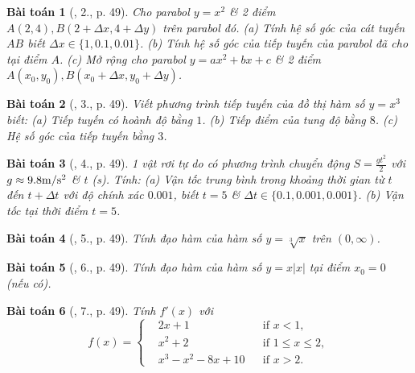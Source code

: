\documentclass{article}
\newtheorem{baitoan}{Bài toán}
\begin{document}
\begin{baitoan}[\cite{TLCT_BT_dai_so_giai_tich_11}, 2., p. 49]
	Cho parabol $y = x^2$ \& 2 điểm $A(2,4),B(2 + \Delta x,4 + \Delta y)$ trên parabol đó. (a) Tính hệ số góc của cát tuyến $AB$ biết $\Delta x\in\{1,0.1,0.01\}$. (b) Tính hệ số góc của tiếp tuyến của parabol đã cho tại điểm $A$. (c) Mở rộng cho parabol $y = ax^2 + bx + c$ \& 2 điểm $A(x_0,y_0),B(x_0 + \Delta x,y_0 + \Delta y)$.
\end{baitoan}

\begin{baitoan}[\cite{TLCT_BT_dai_so_giai_tich_11}, 3., p. 49]
	Viết phương trình tiếp tuyến của đồ thị hàm số $y = x^3$ biết: (a) Tiếp tuyến có hoành độ bằng $1$. (b) Tiếp điểm của tung độ bằng $8$. (c) Hệ số góc của tiếp tuyến bằng $3$.
\end{baitoan}

\begin{baitoan}[\cite{TLCT_BT_dai_so_giai_tich_11}, 4., p. 49]
	1 vật rơi tự do có phương trình chuyển động $S = \frac{gt^2}{2}$ với $g\approx9.8{\rm m{\tt/}s^2}$ \& $t$ (s). Tính: (a) Vận tốc trung bình trong khoảng thời gian từ $t$ đến $t + \Delta t$ với độ chính xác $0.001$, biết $t = 5$ \& $\Delta t\in\{0.1,0.001,0.001\}$. (b) Vận tốc tại thời điểm $t = 5$.
\end{baitoan}

\begin{baitoan}[\cite{TLCT_BT_dai_so_giai_tich_11}, 5., p. 49]
	Tính đạo hàm của hàm số $y = \sqrt[3]{x}$ trên $(0,\infty)$.
\end{baitoan}

\begin{baitoan}[\cite{TLCT_BT_dai_so_giai_tich_11}, 6., p. 49]
	Tính đạo hàm của hàm số $y = x|x|$ tại điểm $x_0 = 0$ (nếu có).
\end{baitoan}

\begin{baitoan}[\cite{TLCT_BT_dai_so_giai_tich_11}, 7., p. 49]
	Tính $f'(x)$ với
	\begin{equation}
		f(x) = \left\{\begin{split}
			&2x + 1&&\mbox{if } x < 1,\\
			&x^2 + 2&&\mbox{if } 1\le x\le2,\\
			&x^3 - x^2 - 8x + 10&&\mbox{if } x > 2.
		\end{split}\right.
	\end{equation}
\end{baitoan}

\end{document}
